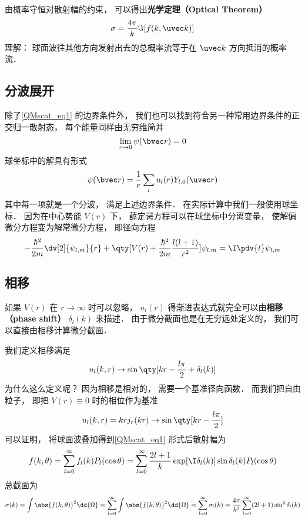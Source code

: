 由概率守恒对散射幅的约束， 可以得出\textbf{光学定理（Optical Theorem）}
\begin{equation}
\sigma = \frac{4\pi}{k} \Im[f(k, \uvec k)]
\end{equation}
理解： 球面波往其他方向发射出去的总概率流等于在 $\uvec k$ 方向抵消的概率流．

\subsection{分波展开}
除了\autoref{QMscat_eq1} 的边界条件外， 我们也可以找到符合另一种常用边界条件的正交归一散射态， 每个能量同样由无穷维简并
\begin{equation}
\lim_{r\to 0} \psi(\bvec r) = 0
\end{equation}
球坐标中的解具有形式
\begin{equation}
\psi(\bvec r) = \frac{1}{r} \sum_l u_l(r) Y_{l,0}(\uvec r)
\end{equation}
其中每一项就是一个分波， 满足上述边界条件． 在实际计算中我们一般使用球坐标． 因为在中心势能 $V(r)$ 下， 薛定谔方程可以在球坐标中分离变量， 使解偏微分方程变为解常微分方程， 即径向方程
\begin{equation}
-\frac{\hbar^2}{2m} \dv[2]{\psi_{l,m}}{r} + \qty[V(r) + \frac{\hbar^2}{2m}\frac{l(l + 1)}{r^2}]\psi_{l,m} = \I \pdv{t} \psi_{l,m}
\end{equation}

\subsection{相移}
如果 $V(r)$ 在 $r\to\infty$ 时可以忽略， $u_l(r)$ 得渐进表达式就完全可以由\textbf{相移（phase shift）} $\delta_l(k)$ 来描述． 由于微分截面也是在无穷远处定义的， 我们可以直接由相移计算微分截面．

我们定义相移满足
\begin{equation}
u_l(k, r) \to \sin\qty[kr - \frac{l\pi}{2} + \delta_l(k)]
\end{equation}
为什么这么定义呢？ 因为相移是相对的， 需要一个基准径向函数． 而我们把自由粒子， 即把 $V(r) \equiv 0$ 时的相位作为基准
\begin{equation}
u_l(k, r) = kr j_r(kr) \to \sin\qty[kr - \frac{l\pi}{2}]
\end{equation}
可以证明， 将球面波叠加得到\autoref{QMscat_eq1} 形式后散射幅为
\begin{equation}
f(k, \theta) = \sum_{l=0}^\infty f_l(k) P_l(\cos\theta) = \sum_{l=0}^\infty  \frac{2l+1}{k} \exp[\I\delta_l(k)] \sin\delta_l (k) P_l(\cos\theta)
\end{equation}
总截面为
\begin{equation}
\sigma(k) = \int \abs{f(k,\theta)}^2 \dd{\Omega} = \sum_{l=0}^\infty \int \abs{f(k,\theta)}^2 \dd{\Omega} =  \sum_{l=0}^\infty \sigma_l(k) = \frac{4\pi}{k^2} \sum_{l=0}^\infty (2l + 1) \sin^2 \delta_l(k)
\end{equation}

